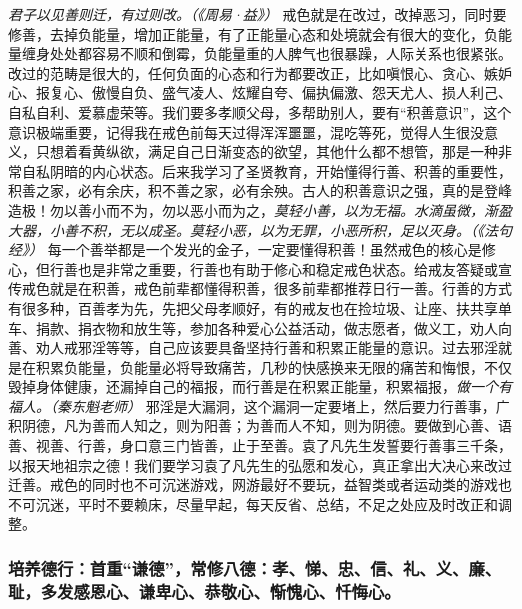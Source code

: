 \textit{君子以见善则迁，有过则改。（《周易·益》）} 戒色就是在改过，改掉恶习，同时要修善，去掉负能量，增加正能量，有了正能量心态和处境就会有很大的变化，负能量缠身处处都容易不顺和倒霉，负能量重的人脾气也很暴躁，人际关系也很紧张。改过的范畴是很大的，任何负面的心态和行为都要改正，比如嗔恨心、贪心、嫉妒心、报复心、傲慢自负、盛气凌人、炫耀自夸、偏执偏激、怨天尤人、损人利己、自私自利、爱慕虚荣等。我们要多孝顺父母，多帮助别人，要有“积善意识”，这个意识极端重要，记得我在戒色前每天过得浑浑噩噩，混吃等死，觉得人生很没意义，只想着看黄纵欲，满足自己日渐变态的欲望，其他什么都不想管，那是一种非常自私阴暗的内心状态。后来我学习了圣贤教育，开始懂得行善、积善的重要性，积善之家，必有余庆，积不善之家，必有余殃。古人的积善意识之强，真的是登峰造极！勿以善小而不为，勿以恶小而为之，\textit{莫轻小善，以为无福。水滴虽微，渐盈大器，小善不积，无以成圣。莫轻小恶，以为无罪，小恶所积，足以灭身。（《法句经》）} 每一个善举都是一个发光的金子，一定要懂得积善！虽然戒色的核心是修心，但行善也是非常之重要，行善也有助于修心和稳定戒色状态。给戒友答疑或宣传戒色就是在积善，戒色前辈都懂得积善，很多前辈都推荐日行一善。行善的方式有很多种，百善孝为先，先把父母孝顺好，有的戒友也在捡垃圾、让座、扶共享单车、捐款、捐衣物和放生等，参加各种爱心公益活动，做志愿者，做义工，劝人向善、劝人戒邪淫等等，自己应该要具备坚持行善和积累正能量的意识。过去邪淫就是在积累负能量，负能量必将导致痛苦，几秒的快感换来无限的痛苦和悔恨，不仅毁掉身体健康，还漏掉自己的福报，而行善是在积累正能量，积累福报，\textit{做一个有福人。（秦东魁老师）} 邪淫是大漏洞，这个漏洞一定要堵上，然后要力行善事，广积阴德，凡为善而人知之，则为阳善；为善而人不知，则为阴德。要做到心善、语善、视善、行善，身口意三门皆善，止于至善。袁了凡先生发誓要行善事三千条，以报天地祖宗之德！我们要学习袁了凡先生的弘愿和发心，真正拿出大决心来改过迁善。戒色的同时也不可沉迷游戏，网游最好不要玩，益智类或者运动类的游戏也不可沉迷，平时不要赖床，尽量早起，每天反省、总结，不足之处应及时改正和调整。

\subsubsection{培养德行：首重“谦德”，常修八德：孝、悌、忠、信、礼、义、廉、耻，多发感恩心、谦卑心、恭敬心、惭愧心、忏悔心。}

